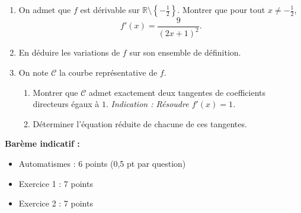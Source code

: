 \documentclass[a4paper,12pt]{article}
\newcommand{\reponse}{\par\vspace{0.5cm}
\framebox[\linewidth]{\begin{minipage}{\dimexpr\linewidth-2\fboxsep}
\vspace{2cm}\hspace{0.5cm}
\end{minipage}}\vspace{0.5cm}
}
\begin{document}
\begin{enumerate}
\item On admet que \(f\) est dérivable sur \(\mathbb{R}\setminus\left\{-\frac{1}{2}\right\}\). Montrer que pour tout \(x \neq -\frac{1}{2}\),
\[
f'(x) = \frac{9}{(2x+1)^2}.
\] \reponse
\item En déduire les variations de \(f\) sur son ensemble de définition. \reponse
\item On note \(\mathcal{C}\) la courbe représentative de \(f\). 
\begin{enumerate}
\item Montrer que \(\mathcal{C}\) admet exactement deux tangentes de coefficients directeurs égaux à \(1\).
\textit{Indication : Résoudre \(f'(x) = 1\).} \reponse
\item Déterminer l'équation réduite de chacune de ces tangentes. \reponse
\end{enumerate}
\end{enumerate}

\vspace{1cm}
\textbf{Barème indicatif :}
\begin{itemize}
\item Automatismes : 6 points (0,5 pt par question)
\item Exercice 1 : 7 points
\item Exercice 2 : 7 points
\end{itemize}
\end{document}
